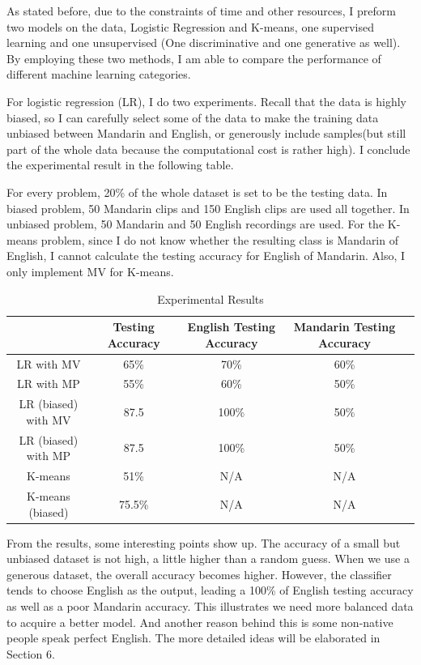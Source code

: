 \documentclass{sig-alternate}
\begin{document}
As stated before, due to the constraints of time and other resources, I preform two models on the data, Logistic Regression and K-means, one supervised learning and one unsupervised (One discriminative and one generative as well). By employing these two methods, I am able to compare the performance of different machine learning categories.

For logistic regression (LR), I do two experiments. Recall that the data is highly biased, so I can carefully select some of the data to make the training data unbiased between Mandarin and English, or generously include samples(but still part of the whole data because the computational cost is rather high). I conclude the experimental result in the following table.

For every problem, 20\% of the whole dataset is set to be the testing data. In biased problem, 50 Mandarin clips and 150 English clips are used all together. In unbiased problem, 50 Mandarin and 50 English recordings are used. For the K-means problem, since I do not know whether the resulting class is Mandarin of English, I cannot calculate the testing accuracy for English of Mandarin. Also, I only implement MV for K-means.

\begin{table}[ht]
\centering
\caption{Experimental Results}
\begin{tabular}{|c|c|c|c|c|} \hline
&Testing Accuracy&English Testing Accuracy&Mandarin Testing Accuracy \\ \hline
LR with MV & 65\% & 70\%  & 60\% \\ \hline
LR with MP & 55\% & 60\%  & 50\% \\ \hline
LR (biased) with MV&87.5 & 100\% & 50\%\\ \hline
LR (biased) with MP&87.5 & 100\% & 50\%\\ \hline
K-means & 51\% & N/A&N/A \\ \hline
K-means (biased)& 75.5\% & N/A&N/A \\ \hline
\end{tabular}
\end{table}

From the results, some interesting points show up. The accuracy of a small but unbiased dataset is not high, a little higher than a random guess. When we use a generous dataset, the overall accuracy becomes higher. However, the classifier tends to choose English as the output, leading a 100\% of English testing accuracy as well as a poor Mandarin accuracy. This illustrates we need more balanced data to acquire a better model. And another reason behind this is some non-native people speak perfect English. The more detailed ideas will be elaborated in Section 6.
\end{document}
